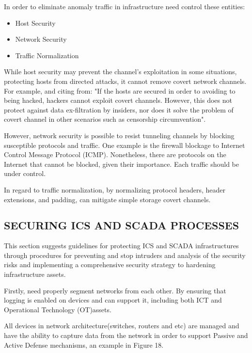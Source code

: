 \documentclass[conference]{IEEEtran}
\begin{document}
In order to eliminate anomaly traffic in infrastructure need control these entities:
\begin{itemize}
\item Host Security
\item Network Security
\item Traffic Normalization
\end{itemize}


	While host security may prevent the channel's exploitation in some situations, protecting hosts from directed attacks, it cannot remove covert network channels. For example, and citing from: "If the hosts are secured in order to avoiding to being hacked, hackers cannot exploit covert channels. However, this does not protect against data ex-filtration by insiders, nor does it solve the problem of covert channel in other scenarios such as censorship circumvention".



	However, network security is possible to resist tunneling channels by blocking susceptible protocols and traffic. One example is the firewall blockage to Internet Control Message Protocol (ICMP). Nonetheless, there are protocols on the Internet that cannot be blocked, given their importance. Each traffic should be under control.



	In regard to traffic normalization, by normalizing protocol headers, header extensions, and padding, can mitigate simple storage covert channels.
	
	
\subsection{SECURING ICS AND SCADA PROCESSES}	

This section suggests guidelines for protecting ICS and SCADA infrastructures through procedures for preventing and stop intruders and analysis of the security risks and implementing a comprehensive security strategy to hardening infrastructure assets.

	

Firstly, need	properly segment networks from each other.
By ensuring that logging is enabled on devices and can support it, including both ICT and Operational Technology (OT)assets.

All devices in network architecture(switches, routers and etc) are managed and have the ability to capture data from the network in order to support Passive and Active Defense mechanisms, an example in Figure 18.
\end{document}
